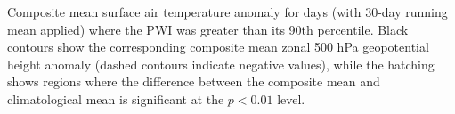 \label{fig:tas_composite}
Composite mean surface air temperature anomaly for days (with 30-day running mean applied) where the PWI was greater than its 90th percentile. Black contours show the corresponding composite mean zonal 500 hPa geopotential height anomaly (dashed contours indicate negative values), while the hatching shows regions where the difference between the composite mean and climatological mean is significant at the $p < 0.01$ level.